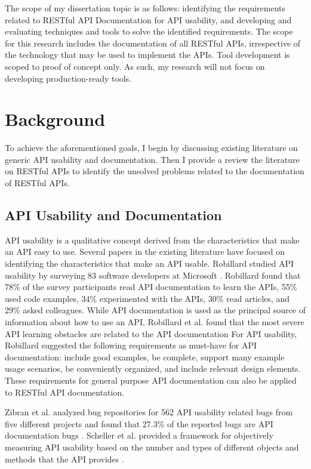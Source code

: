 \documentclass[11pt,oneside]{book}
\begin{document}
The scope of my dissertation topic is as follows: identifying the requirements related to RESTful API Documentation for API usability, and developing and evaluating techniques and tools to solve the identified requirements. The scope for this research includes the documentation of all RESTful APIs, irrespective of the technology that may be used to implement the APIs. Tool development is scoped to proof of concept only. As such, my research will not focus on developing production-ready tools.

\section{Background}

To achieve the aforementioned goals, I begin by discussing existing literature on generic API usability and documentation. Then I provide a review the literature on RESTful APIs to identify the unsolved problems related to the documentation of RESTful APIs.


\subsection{API Usability and Documentation}
API usability is a qualitative concept derived from the characteristics that make an API easy to use. Several papers in the existing literature have focused on identifying the characteristics that make an API usable. Robillard studied API usability by surveying 83 software developers at Microsoft \cite{Robillard_a_field_study}. Robillard found that 78\% of the survey participants read API documentation to learn the APIs, 55\% used code examples, 34\% experimented with the APIs, 30\% read articles, and 29\% asked colleagues. While API documentation is used as the principal source of information about how to use an API, Robillard et al. found that the most severe API learning obstacles are related to the API documentation For API usability, Robillard suggested the following requirements as must-have for API documentation: include good examples, be complete, support many example usage scenarios, be conveniently organized, and include relevant design elements. These requirements for general purpose API documentation can also be applied to RESTful API documentation.

Zibran et al. analyzed bug repositories  for 562 API usability related bugs from five different projects and found that 27.3\% of the reported bugs are API documentation bugs \cite{zibran2011useful}. Scheller et al. provided a framework for objectively measuring API usability based on the number and types of different objects and methods that the API provides \cite{scheller2015automated}.
\end{document}

